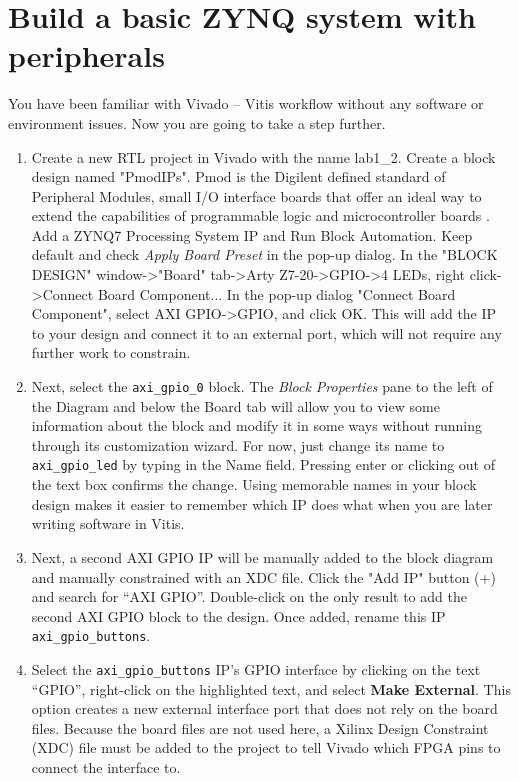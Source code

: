 \documentclass[a4paper,12pt,twoside]{article}
\begin{document}
\section{Build a basic ZYNQ system with peripherals}\label{S3}
You have been familiar with Vivado -- Vitis workflow without any software or environment issues. Now you are going to take a step further.
\begin{enumerate}
    \item Create a new RTL project in Vivado with the name lab1\_2. Create a block design named "PmodIPs". Pmod is the Digilent defined standard of Peripheral Modules, small I/O interface boards that offer an ideal way to extend the capabilities of programmable logic and microcontroller boards \cite{pmod}. Add a ZYNQ7 Processing System IP and Run Block Automation. Keep default and check \textit{Apply Board Preset} in the pop-up dialog. In the "BLOCK DESIGN" window->"Board" tab->Arty Z7-20->GPIO->4 LEDs, right click->Connect Board Component... In the pop-up dialog "Connect Board Component", select AXI GPIO->GPIO, and click OK. This will add the IP to your design and connect it to an external port, which will not require any further work to constrain.
    \item Next, select the \texttt{axi\_gpio\_0} block. The \textit{Block Properties} pane to the left of the Diagram and below the Board tab will allow you to view some information about the block and modify it in some ways without running through its customization wizard. For now, just change its name to \texttt{axi\_gpio\_led} by typing in the Name field. Pressing enter or clicking out of the text box confirms the change. Using memorable names in your block design makes it easier to remember which IP does what when you are later writing software in Vitis.
    \item Next, a second AXI GPIO IP will be manually added to the block diagram and manually constrained with an XDC file. Click the "Add IP" button (+) and search for “AXI GPIO”. Double-click on the only result to add the second AXI GPIO block to the design. Once added, rename this IP \texttt{axi\_gpio\_buttons}.
    \item Select the \texttt{axi\_gpio\_buttons} IP's GPIO interface by clicking on the text “GPIO”, right-click on the highlighted text, and select \textbf{Make External}. This option creates a new external interface port that does not rely on the board files. Because the board files are not used here, a Xilinx Design Constraint (XDC) file must be added to the project to tell Vivado which FPGA pins to connect the interface to.

\end{enumerate}
\end{document}
